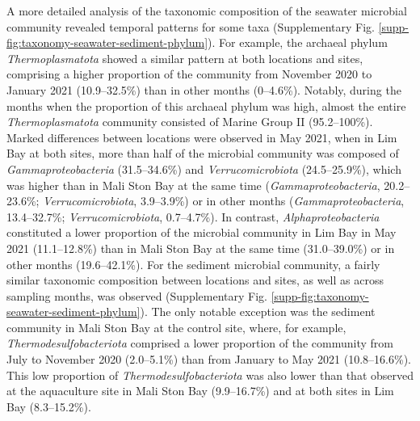 \documentclass[
  12 pt,
]{article}
\begin{document}
A more detailed analysis of the taxonomic composition of the seawater microbial community revealed temporal patterns for some taxa (Supplementary Fig. \ref{supp-fig:taxonomy-seawater-sediment-phylum}). For example, the archaeal phylum \emph{Thermoplasmatota} showed a similar pattern at both locations and sites, comprising a higher proportion of the community from November 2020 to January 2021 (10.9--32.5\unit{\percent}) than in other months (0--4.6\unit{\percent}). Notably, during the months when the proportion of this archaeal phylum was high, almost the entire \emph{Thermoplasmatota} community consisted of Marine Group II (95.2--100\unit{\percent}). Marked differences between locations were observed in May 2021, when in Lim Bay at both sites, more than half of the microbial community was composed of \emph{Gammaproteobacteria} (31.5--34.6\unit{\percent}) and \emph{Verrucomicrobiota} (24.5--25.9\unit{\percent}), which was higher than in Mali Ston Bay at the same time (\emph{Gammaproteobacteria}, 20.2--23.6\unit{\percent}; \emph{Verrucomicrobiota}, 3.9--3.9\unit{\percent}) or in other months (\emph{Gammaproteobacteria}, 13.4--32.7\unit{\percent}; \emph{Verrucomicrobiota}, 0.7--4.7\unit{\percent}). In contrast, \emph{Alphaproteobacteria} constituted a lower proportion of the microbial community in Lim Bay in May 2021 (11.1--12.8\unit{\percent}) than in Mali Ston Bay at the same time (31.0--39.0\unit{\percent}) or in other months (19.6--42.1\unit{\percent}). For the sediment microbial community, a fairly similar taxonomic composition between locations and sites, as well as across sampling months, was observed (Supplementary Fig. \ref{supp-fig:taxonomy-seawater-sediment-phylum}). The only notable exception was the sediment community in Mali Ston Bay at the control site, where, for example, \emph{Thermodesulfobacteriota} comprised a lower proportion of the community from July to November 2020 (2.0--5.1\unit{\percent}) than from January to May 2021 (10.8--16.6\unit{\percent}). This low proportion of \emph{Thermodesulfobacteriota} was also lower than that observed at the aquaculture site in Mali Ston Bay (9.9--16.7\unit{\percent}) and at both sites in Lim Bay (8.3--15.2\unit{\percent}).
\end{document}
